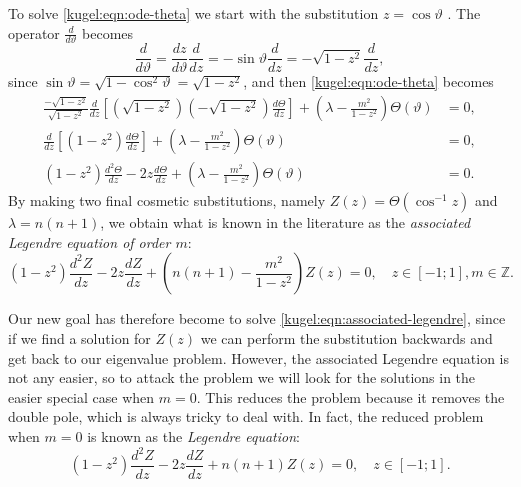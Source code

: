 To solve \eqref{kugel:eqn:ode-theta} we start with the substitution $z = \cos
\vartheta$ . The operator
$\frac{d}{d \vartheta}$ becomes
\begin{equation*}
    \frac{d}{d \vartheta}
    = \frac{dz}{d \vartheta}\frac{d}{dz}
    = -\sin \vartheta \frac{d}{dz}
    = -\sqrt{1-z^2} \frac{d}{dz},
\end{equation*} 
since $\sin \vartheta = \sqrt{1 - \cos^2 \vartheta} = \sqrt{1 - z^2}$, and
then \eqref{kugel:eqn:ode-theta} becomes 
\begin{align*}
  \frac{-\sqrt{1-z^2}}{\sqrt{1-z^2}} \frac{d}{dz} \left[
    \left(\sqrt{1-z^2}\right) \left(-\sqrt{1-z^2}\right) \frac{d \Theta}{dz}
  \right]
  + \left( \lambda - \frac{m^2}{1 - z^2} \right)\Theta(\vartheta) &= 0,
  \\
  \frac{d}{dz} \left[ (1-z^2) \frac{d \Theta}{dz} \right]
  + \left( \lambda - \frac{m^2}{1 - z^2} \right)\Theta(\vartheta) &= 0,
  \\
  (1-z^2)\frac{d^2 \Theta}{dz} - 2z\frac{d \Theta}{dz}
  + \left( \lambda - \frac{m^2}{1 - z^2} \right)\Theta(\vartheta) &= 0.
\end{align*}
By making two final cosmetic substitutions, namely $Z(z) = \Theta(\cos^{-1}z)$
and $\lambda = n(n+1)$, we obtain what is known in the literature as the
\emph{associated Legendre equation of order $m$}:
\nocite{olver_introduction_2013}
\begin{equation} \label{kugel:eqn:associated-legendre}
  (1 - z^2)\frac{d^2 Z}{dz}
  - 2z\frac{d Z}{dz}
  + \left( n(n + 1) - \frac{m^2}{1 - z^2} \right) Z(z) = 0,
  \quad
  z \in [-1; 1], m \in \mathbb{Z}.
\end{equation}

Our new goal has therefore become to solve
\eqref{kugel:eqn:associated-legendre}, since if we find a solution for $Z(z)$ we
can perform the substitution backwards and get back to our eigenvalue problem.
However, the associated Legendre equation is not any easier, so to attack the
problem we will look for the solutions in the easier special case when $m = 0$.
This reduces the problem because it removes the double pole, which is always
tricky to deal with. In fact, the reduced problem when $m = 0$ is known as the
\emph{Legendre equation}:
\begin{equation} \label{kugel:eqn:legendre}
  (1 - z^2)\frac{d^2 Z}{dz}
  - 2z\frac{d Z}{dz}
  + n(n + 1) Z(z) = 0,
  \quad
  z \in [-1; 1].
\end{equation}

